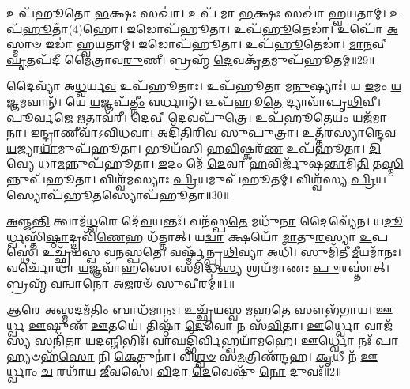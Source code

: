 𑌉𑌪᳴𑌹𑍂𑌤𑍋 \ul{𑌭}\-𑌕𑍍𑌷𑌃 𑌸𑌖𑌾॑।
𑌉𑌪᳴ 𑌮𑌾 \ul{𑌭}\-𑌕𑍍𑌷𑌃 𑌸𑌖𑌾॑ 𑌹𑍍𑌵𑌯𑌤𑌾𑌮𑍍।
𑌉𑌪᳴\-\ul{𑌹𑍂}\-𑌤𑌾𑌁(4)𑌹𑍋।
𑌇𑌡𑍋𑌪᳴𑌹𑍂𑌤𑌾।
𑌉𑌪᳴\-\ul{𑌹𑍂}\-𑌤𑍇𑌡𑌾॑।
𑌉𑌪𑍋᳴ \ul{𑌅}\-𑌸𑍍𑌮𑌾𑍞 𑌇𑌡𑌾॑ 𑌹𑍍𑌵𑌯𑌤𑌾𑌮𑍍।
𑌇𑌡𑍋𑌪᳴𑌹𑍂𑌤𑌾।
𑌉𑌪᳴\-\ul{𑌹𑍂}\-𑌤𑍇𑌡𑌾॑।
\-\ul{𑌮𑌾}\-\-\ul{𑌨}\-𑌵𑍀 \ul{𑌘𑍃}\-𑌤𑌪᳴𑌦𑍀 𑌮𑍈𑌤𑍍𑌰𑌾𑌵\-\ul{𑌰𑍁}\-𑌣𑍀।
𑌬𑍍𑌰𑌹𑍍𑌮᳴ \ul{𑌦𑍇}\-𑌵𑌕𑍃᳴\-\ul{𑌤}\-𑌮𑍁𑌪᳴𑌹𑍂𑌤𑌮𑍍॥29॥

𑌦𑍈𑌵𑍍𑌯𑌾᳴ 𑌅\-\ul{𑌧𑍍𑌵}\-𑌰𑍍𑌯\-\ul{𑌵} 𑌉𑌪᳴𑌹𑍂𑌤𑌾𑌃।
𑌉𑌪᳴𑌹𑍂𑌤𑌾 𑌮\-\ul{𑌨𑍁}\-𑌷𑍍𑌯𑌾𑌃॑।
𑌯 \ul{𑌇}\-𑌮𑌂 \ul{𑌯}\-𑌜𑍍𑌞𑌮𑌵𑌾𑌨𑍍᳴।
𑌯𑍇 \ul{𑌯}\-𑌜𑍍𑌞𑌪᳴\-\ul{𑌤𑍍𑌨𑍀𑌂} 𑌵𑌰𑍍𑌧𑌾𑌨𑍍᳴।
𑌉𑌪᳴𑌹𑍂\-\ul{𑌤𑍇} 𑌦𑍍𑌯𑌾𑌵𑌾᳴𑌪𑍃\-\ul{𑌥𑌿}\-𑌵𑍀।
\-\ul{𑌪𑍂}\-\-\ul{𑌰𑍍𑌵}\-𑌜𑍇 \ul{𑌋}\-𑌤𑌾𑌵᳴𑌰𑍀।
\-\ul{𑌦𑍇}\-𑌵𑍀 \ul{𑌦𑍇}\-𑌵𑌪𑍁᳴𑌤𑍍𑌰𑍇।
𑌉𑌪᳴𑌹𑍂\-\ul{𑌤𑍇}\-𑌯𑌂 𑌯𑌜᳴𑌮𑌾𑌨𑌾।
\-\ul{𑌇}\-\-\ul{𑌨𑍍𑌦𑍍𑌰𑌾}\-𑌣𑍀𑌵𑌾᳴\-𑌽𑌵𑌿\-\ul{𑌧}\-𑌵𑌾।
𑌅𑌦𑌿᳴𑌤𑌿𑌰𑌿𑌵 𑌸𑍁\-\ul{𑌪𑍁}\-𑌤𑍍𑌰𑌾।
𑌉𑌤𑍍𑌤᳴𑌰𑌸𑍍𑌯𑌾𑌨𑍍𑌦𑍇𑌵\-\ul{𑌯}\-𑌜𑍍𑌯𑌾\-\ul{𑌯𑌾}\-𑌮𑍁𑌪᳴𑌹𑍂𑌤𑌾।
𑌭𑍂𑌯᳴𑌸𑌿 𑌹\-\ul{𑌵𑌿}\-𑌷𑍍𑌕𑌰᳴\-\ul{𑌣} 𑌉𑌪᳴𑌹𑍂𑌤𑌾।
\-\ul{𑌦𑌿}\-𑌵𑍍𑌯𑍇 𑌧𑌾\-\ul{𑌮}\-𑌨𑍍𑌨𑍁𑌪᳴𑌹𑍂𑌤𑌾।
\-\ul{𑌇}\-𑌦𑌂 𑌮𑍇᳴ \ul{𑌦𑍇}\-𑌵𑌾 \ul{𑌹}\-𑌵𑌿𑌰𑍍𑌜𑍁᳴𑌷\-\ul{𑌨𑍍𑌤𑌾}\-𑌮𑌿\-\ul{𑌤𑌿} 𑌤\-\ul{𑌸𑍍𑌮𑌿}\-𑌨𑍍𑌨𑍁𑌪᳴𑌹𑍂𑌤𑌾।
𑌵𑌿𑌶𑍍𑌵᳴𑌮𑌸𑍍𑌯𑌾𑌃 \ul{𑌪𑍍𑌰𑌿}\-𑌯𑌮𑍁𑌪᳴𑌹𑍂𑌤𑌮𑍍।
𑌵𑌿𑌶𑍍𑌵᳴𑌸𑍍𑌯 \ul{𑌪𑍍𑌰𑌿}\-𑌯𑌸𑍍𑌯𑍋𑌪᳴𑌹𑍂\-\ul{𑌤}\-𑌸𑍍𑌯𑍋𑌪᳴𑌹𑍂𑌤𑌾॥30॥\anuvakamend[\-\ul{𑌸}\-𑌹𑌰𑍍\mbox{}𑌷᳴𑌭𑌾 𑌹𑍍𑌵𑌯\-\ul{𑌤𑌾}\-𑌮𑍁𑌪᳴𑌹𑍂𑌤𑍞 𑌸𑍁\-\ul{𑌪𑍁}\-𑌤𑍍𑌰𑌾 𑌷𑌟𑍍𑌚᳴]




\clearpage
{}
\setcounter{anuvakam}{0}

\-\ul{𑌅}\-𑌞𑍍𑌜\-\ul{𑌨𑍍𑌤𑌿} 𑌤𑍍𑌵𑌾𑌮᳴\-\ul{𑌧𑍍𑌵}\-𑌰𑍇 𑌦𑍇᳴\-\ul{𑌵}\-𑌯𑌨𑍍𑌤𑌃᳴।
𑌵𑌨᳴𑌸𑍍𑌪\-\ul{𑌤𑍇} 𑌮𑌧𑍁᳴\-\ul{𑌨𑌾} 𑌦𑍈𑌵𑍍𑌯𑍇᳴𑌨।
𑌯\-\ul{𑌦𑍂}\-𑌰𑍍𑌧𑍍𑌵𑌸𑍍𑌤𑌿᳴\-\ul{𑌷𑍍𑌠𑌾}\-𑌦𑍍𑌦𑍍𑌰𑌵𑌿᳴\-\ul{𑌣𑍇}\-𑌹 𑌧᳴𑌤𑍍𑌤𑌾𑌤𑍍।
𑌯\-\ul{𑌦𑍍𑌵𑌾} 𑌕𑍍𑌷𑌯𑍋᳴ \ul{𑌮𑌾}\-𑌤𑍁\-\ul{𑌰}\-𑌸𑍍𑌯𑌾 \ul{𑌉}\-𑌪𑌸𑍍𑌥𑍇॑।
𑌉𑌚𑍍𑌛𑍍𑌰᳴𑌯𑌸𑍍𑌵 𑌵𑌨𑌸𑍍𑌪𑌤𑍇।
𑌵𑌰𑍍𑌷𑍍𑌮᳴𑌨𑍍𑌪𑍃\-\ul{𑌥𑌿}\-𑌵𑍍𑌯𑌾 𑌅𑌧𑌿᳴।
𑌸𑍁𑌮𑌿᳴𑌤𑍀 \ul{𑌮𑍀}\-𑌯𑌮𑌾᳴𑌨𑌃।
𑌵𑌰𑍍𑌚𑍋᳴𑌧𑌾 \ul{𑌯}\-𑌜𑍍𑌞𑌵𑌾᳴𑌹𑌸𑍇।
𑌸𑌮𑌿᳴𑌦𑍍𑌧\-\ul{𑌸𑍍𑌯} 𑌶𑍍𑌰𑌯᳴𑌮𑌾𑌣𑌃 \ul{𑌪𑍁}\-𑌰𑌸𑍍𑌤𑌾॑𑌤𑍍।
𑌬𑍍𑌰𑌹𑍍𑌮᳴ 𑌵\-\ul{𑌨𑍍𑌵𑌾}\-𑌨𑍋 \ul{𑌅}\-𑌜𑌰𑍞᳴ \ul{𑌸𑍁}\-𑌵𑍀𑌰𑌮𑍍॑॥1॥

\-\ul{𑌆}\-𑌰𑍇 \ul{𑌅}\-𑌸𑍍𑌮𑌦𑌮᳴\-\ul{𑌤𑌿𑌂} 𑌬𑌾𑌧᳴𑌮𑌾𑌨𑌃।
𑌉𑌚𑍍𑌛𑍍𑌰᳴𑌯𑌸𑍍𑌵 𑌮\-\ul{𑌹}\-𑌤𑍇 𑌸𑍗𑌭᳴𑌗𑌾𑌯।
\-\ul{𑌊}\-𑌰𑍍𑌧𑍍𑌵 \ul{𑌊}\-𑌷𑍁𑌣᳴ \ul{𑌊}\-𑌤𑌯𑍇॑।
𑌤𑌿𑌷𑍍𑌠𑌾᳴ \ul{𑌦𑍇}\-𑌵𑍋 𑌨 𑌸᳴\-\ul{𑌵𑌿}\-𑌤𑌾।
\-\ul{𑌊}\-𑌰𑍍𑌧𑍍𑌵𑍋 𑌵𑌾𑌜᳴\-\ul{𑌸𑍍𑌯} 𑌸𑌨𑌿᳴\-\ul{𑌤𑌾} 𑌯\-\ul{𑌦}\-𑌞𑍍𑌜𑌿𑌭𑌿𑌃᳴।
\-\ul{𑌵𑌾}\-𑌘𑌦𑍍𑌭𑌿᳴\-\ul{𑌰𑍍𑌵𑌿}\-𑌹𑍍𑌵𑌯𑌾᳴𑌮𑌹𑍇।
\-\ul{𑌊}\-𑌰𑍍𑌧𑍍𑌵𑍋 𑌨𑌃᳴ \ul{𑌪𑌾}\-𑌹𑍍𑌯𑍞𑌹᳴\-\ul{𑌸𑍋} 𑌨𑌿 \ul{𑌕𑍇}\-𑌤𑍁𑌨𑌾॑।
𑌵𑌿\-\ul{𑌶𑍍𑌵}\-\-\ul{𑍞} 𑌸\-\ul{𑌮}\-𑌤𑍍𑌰𑌿𑌣᳴𑌨𑍍𑌦𑌹।
\-\ul{𑌕𑍃}\-𑌧𑍀 𑌨᳴ \ul{𑌊}\-𑌰𑍍𑌧𑍍𑌵𑌾𑌂 \ul{𑌚} 𑌰𑌥𑌾᳴𑌯 \ul{𑌜𑍀}\-𑌵𑌸𑍇॑।
\-\ul{𑌵𑌿}\-𑌦𑌾 \ul{𑌦𑍇}\-𑌵𑍇𑌷𑍁᳴ \ul{𑌨𑍋} 𑌦𑍁𑌵𑌃᳴॥2॥

